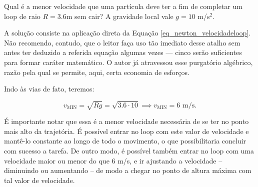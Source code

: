 \begin{exemplo}[Nível I]\label{exemplo_newton_vloopex01}

Qual é a menor velocidade que uma partícula deve ter a fim de completar um loop de raio $R=3.6$m sem cair? A gravidade local vale $g=10$ m/s$^2$.

\resolucao

A solução consiste na aplicação direta da Equação \eqref{eq_newton_velocidadeloop}. Não recomendo, contudo, que o leitor faça uso tão imediato desse atalho sem antes ter deduzido a referida equação algumas vezes — cinco serão suficientes para formar caráter matemático. O autor já atravessou esse purgatório algébrico, razão pela qual se permite, aqui, certa economia de esforços. 

Indo às vias de fato, teremos:

$$ v_{\text{MIN}} = \sqrt{Rg} = \sqrt{3.6 \cdot 10} \implies \boxed{v_{\text{MIN}} =6 \text{ m/s}.} $$


É importante notar que essa é a menor velocidade necessária de se ter no ponto mais alto da trajetória. É possível entrar no loop com este valor de velocidade e mantê-lo constante ao longo de todo o movimento, o que possibilitaria concluir com sucesso a tarefa. De outro modo, é possível também entrar no loop com uma velocidade maior ou menor do que $6$ m/s, e ir ajustando a velocidade -- diminuindo ou aumentando -- de modo a chegar no ponto de altura máxima com tal valor de velocidade.

\end{exemplo}


\vspace{0.3cm}



